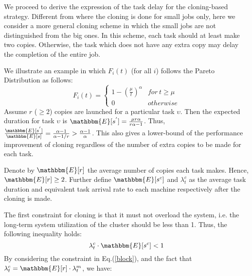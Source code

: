 \documentclass[10pt,conference]{IEEEtran}
\begin{document}
We proceed to derive the expression of the task delay for the cloning-based strategy. Different from {\cite{Cloning}} where the cloning is done for small jobs only, here we consider a more general cloning scheme in which the small jobs are not distinguished from the big ones. In this scheme, each task should at least make two copies. Otherwise, the task which does not have any extra copy may delay the completion of the entire job.

We illustrate an example in which $F_i(t)$ (for all $i$) follows the Pareto Distribution as follows: $$F_i(t) = \left\{\begin{array}{cc}
1-(\frac{\mu}{t})^{\alpha} & for \ t \geq \mu\\
0 & otherwise
\end{array}\right.$$
Assume $r$ ($\geq 2$) copies are launched for a particular task $\upsilon$. Then the expected duration for task $\upsilon$ is
$\mathbbm{E}[s^{'}] = \frac{\mu r\alpha}{r\alpha - 1}$.
Thus, $\frac{\mathbbm{E}[s^{'}]}{\mathbbm{E}[s]} = \frac{\alpha-1}{\alpha-1/r} > \frac{\alpha-1}{\alpha}$. This also gives a lower-bound of  the performance improvement of cloning regardless of the number of extra copies to be made for each task.

Denote by $\mathbbm{E}[r]$ the average number of copies each task makes. Hence, $\mathbbm{E}[r] \geq 2$. Further define $\mathbbm{E}[s^{c}]$ and $\lambda_t^c$ as the average task duration and equivalent task arrival rate to each machine respectively after the cloning is made.

The first constraint for cloning is that it must not overload the system, i.e. the long-term system utilization of the cluster should be less than 1. Thus, the following inequality holds:
\begin{equation}
\lambda_t^c \cdot \mathbbm{E}[s^{c}] < 1
\label{block}
\end{equation}
 By considering the constraint  in Eq.(\ref{block}), and the fact that $\lambda_t^c = \mathbbm{E}[r] \cdot \lambda^m_t$, we have:
\end{document}
